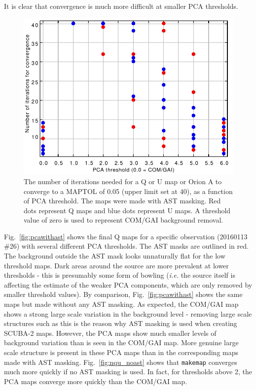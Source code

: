 \documentclass[twoside,11pt]{starlink}
\begin{document}
It is clear that convergence is much more difficult at smaller PCA
thresholds.

\begin{figure}
\includegraphics[width=\columnwidth]{nqu}
\caption{The number of iterations needed for a Q or U map or Orion A to
converge to a MAPTOL of 0.05 (upper limit set at 40), as a function of PCA
threshold. The maps were made with AST masking. Red dots represent Q maps
and blue dots  represent U maps. A threshold value of zero is used to
represent COM/GAI background removal.}
\label{fig:nqu}
\end{figure}

Fig.~\ref{fig:pcawithast} shows the final Q maps for a specific
observation (20160113 \#26) with several different PCA thresholds. The
AST masks are outlined in red. The background outside the AST mask
looks unnaturally flat for the low threshold maps. Dark areas around the
source are more prevalent at lower thresholds - this is presumably some
form of bowling (\emph{i.e.} the source itself is affecting the estimate
of the weaker PCA components, which are only removed by smaller threshold
values). By comparison, Fig.~\ref{fig:pcawithast} shows the same maps but
made without any AST masking. As expected, the COM/GAI map shows a strong
large scale variation in the background level - removing large scale
structures such as this is the reason why AST masking is used when creating
SCUBA-2 maps. However, the PCA maps show much smaller levels of
background variation than is seen in the COM/GAI map. More genuine large
scale structure is present in these PCA maps than in the corresponding maps
made with AST masking. Fig.~\ref{fig:nqu_noast} shows that \texttt{makemap}
converges much more quickly if no AST masking is used. In fact, for
thresholds above 2, the PCA maps converge more quickly than the COM/GAI map.
\end{document}

